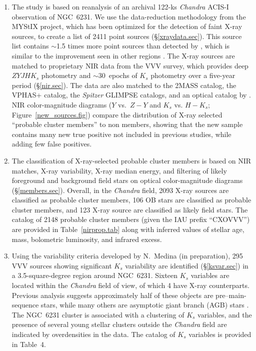 \documentclass[twocolumn,tighten]{aastex61}
\begin{document}
\begin{enumerate}


\item The study is based on reanalysis of an archival 122-ks {\it Chandra} ACIS-I observation of NGC~6231. We use the data-reduction methodology from the MYStIX project, which has been optimized for the detection of faint X-ray sources, to create a list of 2411 point sources  (\S\ref{xraydata.sec}). This source list contains $\sim$1.5 times more point sources than detected by , which is similar to the improvement seen in other regions \citep{2010ApJ...714.1582B,2013ApJS..209...27K}. The X-ray sources are matched to proprietary NIR data from the VVV survey, which provides deep $ZYJHK_s$ photometry and $\sim$30~epochs of $K_s$ photometry over a five-year period (\S\ref{nir.sec}). The data are also matched to the 2MASS catalog, the VPHAS+ catalog, the {\it Spitzer} GLIMPSE catalogs, and an optical catalog by \citet{2013AJ....145...37S}. NIR color-magnitude diagrams ($Y$ vs.\ $Z-Y$ and $K_s$ vs. $H-K_s$; Figure~\ref{new_sources.fig}) compare the distribution of X-ray selected ``probable cluster members'' to non members, showing that the new sample contains many new true positive not included in previous studies, while adding few false positives.

\item The classification of X-ray-selected probable cluster members is based on NIR matches, X-ray variability, X-ray median energy, and filtering of likely foreground and background field stars on optical color-magnitude diagrams (\S\ref{members.sec}). Overall, in the {\it Chandra} field, 2093 X-ray sources are classified as probable cluster members, 106 OB stars are classified as probable cluster members, and 123 X-ray source are classified as likely field stars. The catalog of 2148 probable cluster members (given the IAU prefix ``CXOVVV'') are provided in Table~\ref{nirprop.tab} along with inferred values of stellar age, mass, bolometric luminosity, and infrared excess. 

\item Using the variability criteria developed by N.\ Medina (in preparation), 295 VVV sources showing significant $K_s$ variability are identified (\S\ref{ksvar.sec}) in a 3.5-square-degree region around NGC~6231. Sixteen $K_s$ variables are located within the {\it Chandra} field of view, of which 4 have X-ray counterparts. Previous analysis suggests approximately half of these objects are pre--main-sequence stars, while many others are asymptotic giant branch (AGB) stars \citep{2016arXiv160206269C,2016arXiv160206267C}. The NGC~6231 cluster is associated with a clustering of $K_s$ variables, and the presence of several young stellar clusters outside the {\it Chandra} field are indicated by overdensities in the data. The catalog of $K_s$ variables is provided in Table~4.




\end{enumerate}
\end{document}

